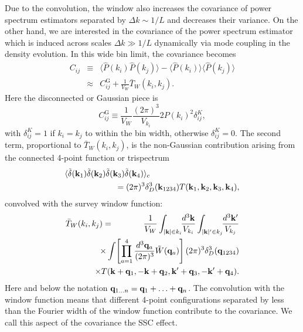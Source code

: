\documentclass[prd,twocolumn,amsmath,amssymb,floatfix,superscriptaddress]{revtex4-1}
\newcommand{\bk}{{\bf k}}
\newcommand{\bq}{{\bf q}}
\newcommand{\tW}{\tilde{W}}
\begin{document}
Due to the convolution, the window also increases the covariance of power spectrum estimators
separated by $\Delta k \sim 1/L$ and decreases their variance. On the other
hand, we are interested in 
the covariance of the power spectrum estimator which is induced  
across scales $\Delta k \gg 1/L$ dynamically via mode coupling in the density evolution.   In this wide bin limit, the covariance becomes
%
\begin{eqnarray}
C_{ij}&\equiv& 
\langle {\hat{P}(k_i)\hat{P}(k_j)} \rangle-
\langle {\hat{P}(k_i)}\rangle \langle{\hat{P}(k_j)}\rangle \nonumber\\
& \approx & C_{ij}^\text{G} + \frac{1}{V_W} \bar{T}_W(k_i,k_j).
\label{eq:pscov1}
\end{eqnarray}
%
Here the disconnected or Gaussian piece is
%
\begin{equation}
C_{ij}^\text{G} \equiv \frac{1}{V_W} \frac{(2\pi)^3}{V_{k_i}} 2 P(k_i)^2
			     \delta^K_{ij},
			     \label{eqn:Cgaussian}
\end{equation} 			     
%
with $\delta_{ij}^K=1$
if $k_i=k_j$ to within the bin width, otherwise $\delta_{ij}^K=0$.
 The
second term, proportional to $\bar{T}_W(k_i,k_j)$, is the non-Gaussian
contribution arising from the connected 4-point function or trispectrum
%
\begin{eqnarray}
\langle \tilde \delta(\bk_1 ) \tilde \delta(\bk_2 )\tilde \delta(\bk_3
 )\tilde \delta(\bk_4 )\rangle_c &&\nonumber\\
&&\hspace{-5em}=
(2\pi)^3 \delta_D^3(\bk_{1234}) T(\bk_1,\bk_2,\bk_3,\bk_4),
\end{eqnarray}
%
convolved with the survey
window function:
%
\begin{eqnarray}
 \bar{T}_W(k_i,k_j)&=&\frac{1}{V_{W}}
\int_{|\bk|\in k_i}\!\!\frac{d^3\bk}{V_{k_i}}
\int_{|\bk|'\in k_j}\!\!\frac{d^3\bk'}{V_{k_j}}\nonumber\\
&&\hspace{-3em}\times\int\!\left[\prod_{a=1}^4\frac{d^3\bq_a}{(2\pi)^3}
\tW(\bq_a)\right](2\pi)^3\delta^3_D(\bq_{1234})\nonumber\\
&&\hspace{-3em}\times
T(\bk+\bq_1,-\bk+\bq_2,\bk'+\bq_3,-\bk'+\bq_4).
\label{eq:pscov}
\end{eqnarray}
%
Here and below the notation $\bq_{1\ldots n}= \bq_1+\ldots+ \bq_n$.
The convolution with the window function means that 
 different 4-point configurations separated by less than the Fourier
width of the window function contribute to the covariance.  We call this aspect of the covariance the SSC effect.
\end{document}
